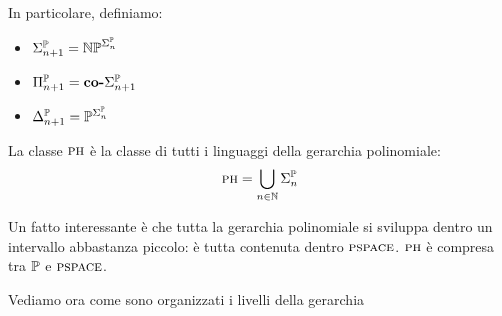 In particolare, definiamo:
\begin{itemize}
    \item $\Sigma_{n+1}^{\mathbb{P}} = \mathbb{NP}^{\Sigma_{n}^{\mathbb{P}}}$
    \item $\Pi_{n+1}^{\mathbb{P}} = \textbf{co-}\Sigma_{n+1}^{\mathbb{P}}$
    \item $\Delta_{n+1}^{\mathbb{P}} = \mathbb{P}^{\Sigma_{n}^{\mathbb{P}}}$
\end{itemize}

La classe $\textsc{ph}$ è la classe di tutti i linguaggi della gerarchia polinomiale:
\begin{equation*}
    \textsc{ph} = \bigcup_{n \in \mathbb{N}}\Sigma_{n}^{\mathbb{P}}
\end{equation*}

Un fatto interessante è che tutta la gerarchia polinomiale si sviluppa dentro un intervallo
abbastanza piccolo: è tutta contenuta dentro $\textsc{pspace}$. $\textsc{ph}$ è compresa tra $\mathbb{P}$ e
$\textsc{pspace}$.


Vediamo ora come sono organizzati i livelli della gerarchia

